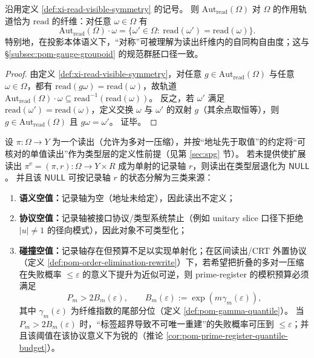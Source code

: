 \begin{proposition}[可见对称的轨道与读出纤维]\label{prop:xi-read-fiber-orbits}
沿用定义 \ref{def:xi-read-visible-symmetry} 的记号。
则 \(\mathrm{Aut}_{\mathrm{read}}(\Omega)\) 对 \(\Omega\) 的作用轨道恰为 \(\mathrm{read}\) 的纤维：对任意 \(\omega\in\Omega\) 有
\[
\mathrm{Aut}_{\mathrm{read}}(\Omega)\cdot\omega
=\{\omega'\in\Omega:\ \mathrm{read}(\omega')=\mathrm{read}(\omega)\}.
\]
特别地，在投影本体语义下，“对称”可被理解为读出纤维内的自同构自由度；这与 \S\ref{subsec:pom-gauge-groupoid} 的规范群胚口径一致。
\end{proposition}

\begin{proof}
由定义 \ref{def:xi-read-visible-symmetry}，对任意 \(g\in\mathrm{Aut}_{\mathrm{read}}(\Omega)\) 与任意 \(\omega\in\Omega\)，都有 \(\mathrm{read}(g\omega)=\mathrm{read}(\omega)\)，故轨道 \(\mathrm{Aut}_{\mathrm{read}}(\Omega)\cdot\omega\subseteq \mathrm{read}^{-1}(\mathrm{read}(\omega))\)。
反之，若 \(\omega'\) 满足 \(\mathrm{read}(\omega')=\mathrm{read}(\omega)\)，定义交换 \(\omega\) 与 \(\omega'\) 的双射 \(g\)（其余点取恒等），则 \(g\in\mathrm{Aut}_{\mathrm{read}}(\Omega)\) 且 \(g\omega=\omega'\)。
证毕。
\end{proof}

\begin{proposition}\label{prop:xi-null-three-way}
设 \(\pi:\Omega\to Y\) 为一个读出（允许为多对一压缩），并按“地址先于取值”的约定将“可核对的单值读出”作为类型层的定义性前提（见第 \ref{sec:spg} 节）。
若未提供使扩展读出
\(
\pi^{\mathrm e}=(\pi,r):\Omega\to Y\times R
\)
成为单射的记录轴 \(r\)，则读出在类型层退化为 \(\mathsf{NULL}\)。
并且该 \(\mathsf{NULL}\) 可按记录轴 \(r\) 的状态分解为三类来源：
\begin{enumerate}
  \item \textbf{语义空值：}记录轴为空（地址未给定），因此读出不定义；
  \item \textbf{协议空值：}记录轴被接口协议/类型系统禁止（例如 unitary slice 口径下拒绝 \(|u|\neq 1\) 的径向模式），因此对象不可类型化；
  \item \textbf{碰撞空值：}记录轴存在但预算不足以实现单射化；在区间读出/CRT 外置协议（定义 \ref{def:pom-order-elimination-rewrite}）下，若希望把折叠的多对一压缩在失败概率 \(\le\varepsilon\) 的意义下提升为近似可逆，则 prime-register 的模积预算必须满足
  \[
  P_m>2B_m(\varepsilon),
  \qquad
  B_m(\varepsilon):=\exp(m\gamma_m(\varepsilon)),
  \]
  其中 \(\gamma_m(\varepsilon)\) 为纤维指数的尾部分位（定义 \ref{def:pom-gamma-quantile}）。
  当 \(P_m>2B_m(\varepsilon)\) 时，“标签超界导致不可唯一重建”的失败概率可压到 \(\le\varepsilon\)；并且该阈值在该协议意义下为锐的（推论 \ref{cor:pom-prime-register-quantile-budget}）。
\end{enumerate}
\end{proposition}


